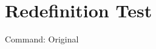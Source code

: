 \documentclass{article}
\begin{document}
\newcommand{\testcmd}{Original}
\section{Redefinition Test}
Command: \testcmd
\end{document}
